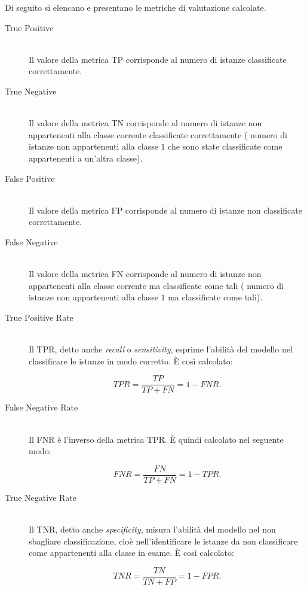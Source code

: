 Di seguito si elencano e presentano le metriche di valutazione calcolate.
\begin{description}
	\item[True Positive] \hfill \\
	Il valore della metrica \acf{TP} corrisponde al numero di istanze classificate correttamente.
	\item[True Negative] \hfill \\
	Il valore della metrica \acf{TN} corrisponde al numero di istanze non appartenenti alla classe corrente classificate correttamente (\eg{} numero di istanze non appartenenti alla classe $1$ che sono state classificate come appartenenti a un'altra classe).
	\item[False Positive] \hfill \\
	Il valore della metrica \acf{FP} corrisponde al numero di istanze non classificate correttamente.
	\item[False Negative] \hfill \\
	Il valore della metrica \acf{FN} corrisponde al numero di istanze non appartenenti alla classe corrente ma classificate come tali (\eg{} numero di istanze non appartenenti alla classe $1$ ma classificate come tali).
	\item[True Positive Rate] \hfill \\
	Il \acf{TPR}, detto anche \emph{recall} o \emph{sensitivity}, esprime l'abilità del modello nel classificare le istanze in modo corretto. \`E così calcolato:\par
	\[TPR=\frac{TP}{TP + FN} = 1 - FNR\text{.}\]
	\item[False Negative Rate] \hfill \\
	Il \acf{FNR} è l'inverso della metrica \acs{TPR}. \`E quindi calcolato nel seguente modo:\par
	\[FNR=\frac{FN}{TP + FN} = 1 - TPR\text{.}\]
	\item[True Negative Rate] \hfill \\
	Il \acf{TNR}, detto anche \emph{specificity}, misura l'abilità del modello nel non sbagliare classificazione, cioè nell'identificare le istanze da non classificare come appartenenti alla classe in esame. \`E così calcolato:\par
	\[TNR=\frac{TN}{TN + FP} = 1 - FPR\text{.}\]

\end{description}
